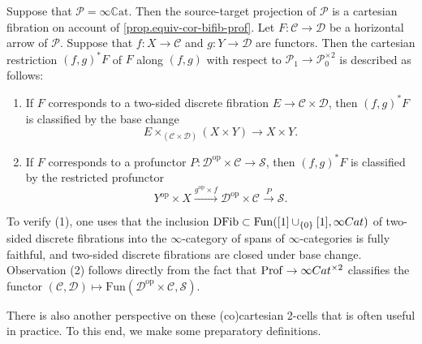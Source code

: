 \documentclass[a4paper, 11pt]{amsart}
\numberwithin{theorem}{section}
\theoremstyle{definition}
\newcommand{\cat}[1]{\textup{#1}}
\newcommand{\op}{\mathrm{op}}
\newcommand{\fun}{\mathrm{Fun}}
\newcommand{\Cat}{\cat{Cat}}
\renewcommand{\S}{\mathscr{S}}
\newcommand{\C}{\mathscr{C}}
\renewcommand{\D}{\mathscr{D}}
\renewcommand{\P}{\mathscr{P}}
\newcommand{\DFib}{\mathrm{DFib}}
\newcommand{\CCAT}{\mathbb{C}\mathrm{at}}
\newcommand{\prof}{\mathrm{Prof}}
\begin{document}
\begin{example}\label{ex.ccat-cart-lifts}
	Suppose that $\P = \infty\CCAT$. Then the source-target projection of $\P$ is a cartesian fibration on account of \cref{prop.equiv-cor-bifib-prof}. 
	Let $F : \C \rightarrow \D$ be a horizontal arrow of $\P$. Suppose that $f : X \rightarrow \C$ and $g : Y \rightarrow \D$ are functors. 
	Then the cartesian restriction $(f,g)^*F$ of $F$ along $(f,g)$ with respect to $\P_1 \rightarrow \P_0^{\times 2}$ is described as follows:
	\begin{enumerate}
		\item If $F$ corresponds to a two-sided discrete fibration $E \rightarrow \C \times \D$, then $(f,g)^*F$ is classified by the base change  
		$$
		E \times_{(\C \times \D)} (X\times Y) \rightarrow X\times Y.
		$$
		\item If $F$ corresponds to a profunctor $P : \D^\op \times \C \rightarrow \S$, then $(f,g)^*F$ is classified by the restricted profunctor 
		$$
		Y^\op \times X \xrightarrow{g^\op \times f} \D^\op \times \C \xrightarrow{P} \S.
		$$
	\end{enumerate}
	To verify (1), one uses that the inclusion $\DFib \subset \fun([1] \cup_{\{0\}} [1], \infty\Cat)$ of two-sided discrete fibrations 
	into the $\infty$-category of spans of $\infty$-categories is fully faithful, and two-sided discrete fibrations are closed under base change. 
		Observation (2) follows directly from the fact that $\prof \rightarrow \infty\Cat^{\times 2}$ classifies the functor $(\C, \D) \mapsto \fun(\D^\op \times \C, \S)$.
\end{example}

There is also another perspective on these (co)cartesian 2-cells that is often useful in practice. To this end, we make some preparatory definitions.
\end{document}
